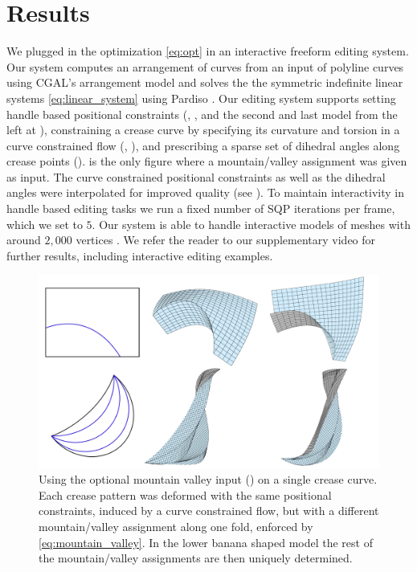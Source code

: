 \section{Results} \label{sec:results}
We plugged in the optimization \eqref{eq:opt} in an interactive freeform editing system. Our system computes an arrangement of curves from an input of polyline curves using CGAL's arrangement model \cite{cgal,cgal_arr1,cgal_arr2} and solves the the symmetric indefinite  linear systems \eqref{eq:linear_system} using Pardiso \cite{PARDISO1,PARDISO2,PARDISO3}. Our editing system supports setting handle based positional constraints (, , and the second and last model from the left at ), constraining a crease curve by specifying its curvature and torsion in a curve constrained flow (, ), and prescribing a sparse set of dihedral angles along crease points ().  is the only figure where a mountain/valley assignment was given as input. The curve constrained positional constraints as well as the dihedral angles were interpolated for improved quality (see ). To maintain interactivity in handle based editing tasks we run a fixed number of SQP iterations per frame, which we set to $5$. Our system is able to handle interactive models of meshes with around $2,000$ vertices . We refer the reader to our supplementary video for further results, including interactive editing examples. 

\begin{figure} [h]
	\centering
	\includegraphics[width=\linewidth]{figures/MV_bias_modeling}
	\caption{Using the optional mountain valley input () on a single crease curve. Each crease pattern was deformed with the same positional constraints, induced by a curve constrained flow, but with a different mountain/valley assignment along one fold, enforced by \eqref{eq:mountain_valley}. In the lower banana shaped model the rest of the mountain/valley assignments are then uniquely determined.}
	\label{fig:MV_bias_modeling}
\end{figure}


